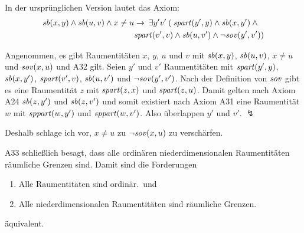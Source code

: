     In der ursprünglichen Version lautet das Axiom:
    \begin{align*}
        \mathit{sb}(x,y) \land \mathit{sb}(u,v) \land x\neq u &\to\: 
        \exists y'v'\:(\: \mathit{spart}(y',y) \land \mathit{sb}(x,y') 
        \land \mbox{} \\
        &\mathit{spart}(v',v) 
        \land \mathit{sb}(u,v') \land \neg \mathit{sov}(y',v'))
    \end{align*}

    
    Angenommen, es gibt Raumentitäten $x$, $y$, $u$ und $v$ mit $\mathit{sb}(x,y)$, $\mathit{sb}(u,v)$, $x \neq u$ und $\mathit{sov}(x,u)$ und A32 gilt.
    Seien $y'$ und $v'$ Raumentitäten mit $\mathit{spart}(y',y)$, $\mathit{sb}(x,y')$, $\mathit{spart}(v',v)$, $\mathit{sb}(u,v')$ und $\neg \mathit{sov}(y',v')$.
    Nach der Definition von $\mathit{sov}$ gibt es eine Raumentität $z$ mit $\mathit{spart}(z,x)$ und $\mathit{spart}(z,u)$.
    Damit gelten nach Axiom A24
    $\mathit{sb}(z,y')$ und $\mathit{sb}(z,v')$ und somit existiert nach Axiom A31 eine Raumentität $w$ mit $\mathit{sppart}(w,y')$ und $\mathit{sppart}(w,v')$.
    Also überlappen $y'$ und $v'$. $\lightning$
    
    Deshalb schlage ich vor, $x \neq u$ zu $\neg \mathit{sov}(x,u)$ zu verschärfen.
% 
% 				

    A33
    schließlich besagt, dass alle ordinären niederdimensionalen Raumentitäten räumliche Grenzen sind.
    Damit sind die Forderungen
    \begin{enumerate}
     \item \glqq Alle Raumentitäten sind ordinär.\grqq\ und
     \item \glqq Alle niederdimensionalen Raumentitäten sind räumliche Grenzen.\grqq
    \end{enumerate}
    äquivalent.


